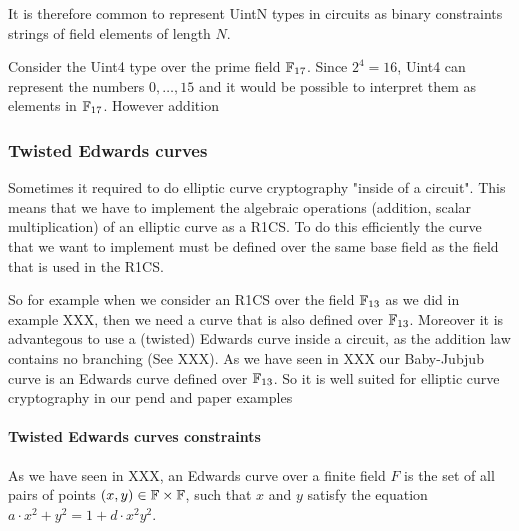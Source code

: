 It is therefore common to represent UintN types in circuits as binary constraints strings of field elements of length $N$.

\begin{example}
Consider the Uint4 type over the prime field $\mathbb{F}_{17}$. Since $2^4=16$, Uint4 can represent the numbers $0,\ldots, 15$ and it would be possible to interpret them as elements in $\mathbb{F}_{17}$. However addition 
\end{example} 



\subsubsection{Twisted Edwards curves}
Sometimes it required to do elliptic curve cryptography "inside of a circuit". This means that we have to implement the algebraic operations (addition, scalar multiplication) of an elliptic curve as a R1CS. To do this efficiently the curve that we want to implement must be defined over the same base field as the field that is used in the R1CS. 


\begin{example}
So for example when we consider an R1CS over the field $\mathbb{F}_{13}$ as we did in example XXX, then we need a curve that is also defined over $\mathbb{F}_{13}$. Moreover it is advantegous to use a (twisted) Edwards curve inside a circuit, as the addition law contains no branching (See XXX). As we have seen in XXX our Baby-Jubjub curve is an Edwards curve defined over $\mathbb{F}_{13}$. So it is well suited for elliptic curve cryptography in our pend and paper examples
\end{example}

\paragraph{Twisted Edwards curves constraints} As we have seen in XXX, an Edwards curve over a finite field $F$ is the set of all pairs of points $(x,y)\in \mathbb{F}\times \mathbb{F}$, such that $x$ and $y$ satisfy the equation $a\cdot x^2+y^2= 1+d\cdot x^2y^2$. 

